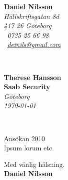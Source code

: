 \documentclass[11pt,a4paper]{article}
\begin{document}
\sffamily   %
\hfill%
\begin{minipage}[t]{.6\textwidth}
\raggedleft%
{\bfseries Daniel Nilsson}\\[.35ex]
\small\itshape%
Hällskriftsgatan 8d\\
417 26 Göteborg\\[.35ex]
\Mobilefone~0735 25 66 98 \\
\Letter~\href{mailto:deinils@gmail.com}{deinils@gmail.com}
\end{minipage}\\[1em]
%
\begin{minipage}[t]{.4\textwidth}
\raggedright%
{\bfseries Therese Hansson}\\[.35ex]
{\bfseries Saab Security}\\[.35ex]
\small\itshape%
Göteborg\\
\today
\end{minipage}
\hfill %
\begin{minipage}[t]{.4\textwidth}
\raggedleft %
\end{minipage}\\[2em]
\raggedright
Ansökan 2010\\[1.5em]
%

Ipsum lorum etc.


 



Med vänlig hälsning. \\%
%
{\bfseries Daniel Nilsson}\\
%
\vfill%
\end{document}
